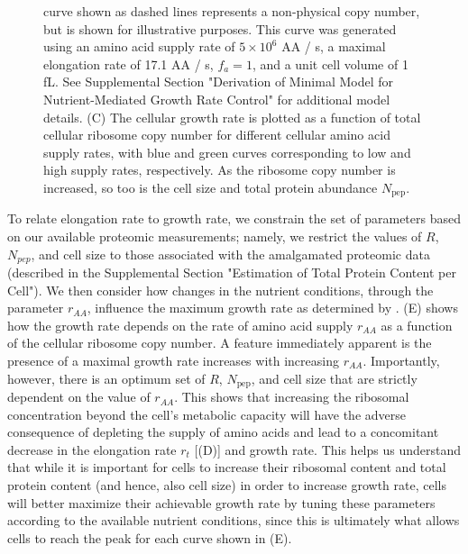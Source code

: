 \begin{figure}
{{        curve shown as dashed lines represents a non-physical copy number, but
        is shown for illustrative purposes. This curve was generated using an
        amino acid supply rate of $5 \times 10^6$ AA / s, a maximal elongation
        rate of 17.1 AA / s, $f_a = 1$, and a unit cell volume of 1 fL.
        See Supplemental Section "Derivation of Minimal Model for Nutrient-Mediated
        Growth Rate Control" for additional model details. (C) The cellular
        growth rate is plotted as a function of total cellular ribosome copy
        number for different cellular amino acid supply rates, with blue and
        green curves corresponding to low and high supply rates, respectively.
        As the ribosome copy number is increased, so too is the cell size and
        total protein abundance $N_\text{pep}$.
    }
    \label{fig:elongation_rate_model}
    }
\end{figure}

To relate elongation rate to growth rate, we constrain the set of parameters
based on our available proteomic measurements; namely, we restrict the values of
$R$, $N_{pep}$, and cell size to those associated with the amalgamated proteomic
data (described in the Supplemental Section "Estimation of Total Protein Content per
Cell"). We then consider how changes in the nutrient conditions, through the
parameter $r_{AA}$, influence the maximum growth rate as determined by
. (E) shows how the growth rate
depends on the rate of amino acid supply $r_{AA}$ as a function of the cellular
ribosome copy number. A feature immediately apparent is the presence of a
maximal growth rate increases with increasing $r_{AA}$. Importantly, however,
there is an optimum set of $R$, $N_\text{pep}$, and cell size that are strictly
dependent on the value of $r_{AA}$. This shows that increasing the ribosomal
concentration beyond the cell's metabolic capacity will have the adverse
consequence of depleting the supply of amino acids and lead to a concomitant
decrease in the elongation rate $r_t$ [(D)] and
growth rate. This helps us understand that while it is important for cells to
increase their ribosomal content and total protein content (and hence, also cell
size) in order to increase growth rate, cells will better maximize their
achievable growth rate by tuning these parameters according to the available
nutrient conditions, since this is ultimately what allows cells to reach the
peak for each curve shown in (E).

